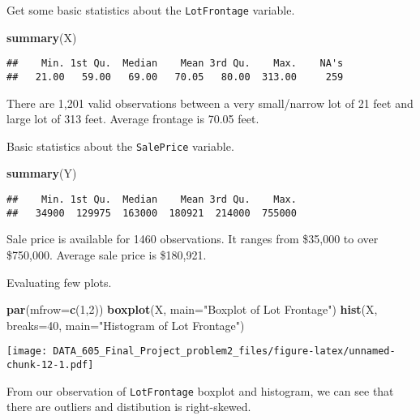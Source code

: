 \documentclass[]{article}
\newenvironment{Shaded}{\begin{snugshade}}{\end{snugshade}}
\newcommand{\DataTypeTok}[1]{\textcolor[rgb]{0.13,0.29,0.53}{#1}}
\newcommand{\DecValTok}[1]{\textcolor[rgb]{0.00,0.00,0.81}{#1}}
\newcommand{\KeywordTok}[1]{\textcolor[rgb]{0.13,0.29,0.53}{\textbf{#1}}}
\newcommand{\NormalTok}[1]{#1}
\newcommand{\StringTok}[1]{\textcolor[rgb]{0.31,0.60,0.02}{#1}}
\begin{document}
Get some basic statistics about the \texttt{LotFrontage} variable.

\begin{Shaded}
\begin{Highlighting}[]
\KeywordTok{summary}\NormalTok{(X)}
\end{Highlighting}
\end{Shaded}

\begin{verbatim}
##    Min. 1st Qu.  Median    Mean 3rd Qu.    Max.    NA's 
##   21.00   59.00   69.00   70.05   80.00  313.00     259
\end{verbatim}

There are 1,201 valid observations between a very small/narrow lot of 21
feet and large lot of 313 feet. Average frontage is 70.05 feet.

Basic statistics about the \texttt{SalePrice} variable.

\begin{Shaded}
\begin{Highlighting}[]
\KeywordTok{summary}\NormalTok{(Y)}
\end{Highlighting}
\end{Shaded}

\begin{verbatim}
##    Min. 1st Qu.  Median    Mean 3rd Qu.    Max. 
##   34900  129975  163000  180921  214000  755000
\end{verbatim}

Sale price is available for 1460 observations. It ranges from \$35,000
to over \$750,000. Average sale price is \$180,921.

Evaluating few plots.

\begin{Shaded}
\begin{Highlighting}[]
\KeywordTok{par}\NormalTok{(}\DataTypeTok{mfrow=}\KeywordTok{c}\NormalTok{(}\DecValTok{1}\NormalTok{,}\DecValTok{2}\NormalTok{))}
\KeywordTok{boxplot}\NormalTok{(X, }\DataTypeTok{main=}\StringTok{"Boxplot of Lot Frontage"}\NormalTok{)}
\KeywordTok{hist}\NormalTok{(X, }\DataTypeTok{breaks=}\DecValTok{40}\NormalTok{, }\DataTypeTok{main=}\StringTok{"Histogram of Lot Frontage"}\NormalTok{)}
\end{Highlighting}
\end{Shaded}

\texttt{[image: DATA\_605\_Final\_Project\_problem2\_files/figure-latex/unnamed-chunk-12-1.pdf]}

From our observation of \texttt{LotFrontage} boxplot and histogram, we
can see that there are outliers and distibution is right-skewed.
\end{document}
